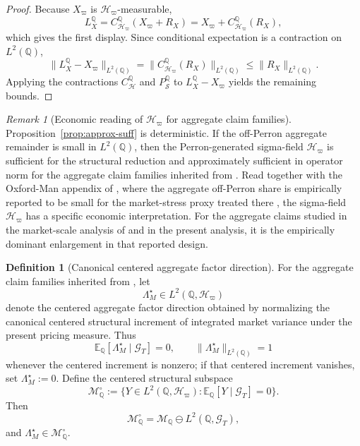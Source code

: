 \documentclass[11pt,a4paper]{amsart}
\theoremstyle{plain}
\theoremstyle{definition}
\newtheorem{definition}[theorem]{Definition}
\theoremstyle{remark}
\newtheorem{remark}[theorem]{Remark}
\newcommand{\QQ}{\mathbb{Q}}
\newcommand{\EE}{\mathbb{E}}
\newcommand{\cG}{\mathcal{G}}
\newcommand{\cH}{\mathcal{H}}
\newcommand{\cM}{\mathcal{M}}
\newcommand{\cS}{\mathcal{S}}
\begin{document}
\begin{proof}
Because \(X_\varpi\) is \(\cH_\varpi\)-measurable,
\[
        L_X^\QQ
        =
        C_{\cH_\varpi}^\QQ(X_\varpi+R_X)
        =
        X_\varpi+C_{\cH_\varpi}^\QQ(R_X),
 \]
which gives the first display.  Since conditional expectation is a contraction on \(L^2(\QQ)\),
\[
        \|L_X^\QQ-X_\varpi\|_{L^2(\QQ)}
        =
        \|C_{\cH_\varpi}^\QQ(R_X)\|_{L^2(\QQ)}
        \le
        \|R_X\|_{L^2(\QQ)}.
\]
Applying the contractions \(C_{\cH}^\QQ\) and \(P_\cS^\QQ\) to \(L_X^\QQ-X_\varpi\) yields the
remaining bounds.
\end{proof}

\begin{remark}[Economic reading of \(\cH_\varpi\) for aggregate claim families]\label{rem:approx-suff}
Proposition~\ref{prop:approx-suff} is deterministic.  If the off-Perron aggregate remainder is
small in \(L^2(\QQ)\), then the Perron-generated sigma-field \(\cH_\varpi\) is sufficient for the
structural reduction and approximately sufficient in operator norm for the aggregate claim families
inherited from \cite{vidal2026market}.  Read together with the Oxford-Man appendix of
\cite{vidal2026market}, where the aggregate off-Perron share is empirically reported to be small for
the market-stress proxy treated there
\cite{heber2009realized,barndorffNielsen2008realized,shephardSheppard2010heavy}, the sigma-field
\(\cH_\varpi\) has a specific economic interpretation.  For the aggregate claims studied in the
market-scale analysis of \cite{vidal2026market} and in the present analysis, it is the empirically
dominant enlargement in that reported design.
\end{remark}

\begin{definition}[Canonical centered aggregate factor direction]\label{def:agg-factor}
For the aggregate claim families inherited from \cite{vidal2026market}, let
\[
        \Lambda_M^\star\in L^2(\QQ,\cH_\varpi)
\]
denote the centered aggregate factor direction obtained by normalizing the canonical centered
structural increment of integrated market variance under the present pricing measure.  Thus
\[
        \EE_\QQ[\Lambda_M^\star\mid \cG_T]=0,
        \qquad
        \|\Lambda_M^\star\|_{L^2(\QQ)}=1
\]
whenever the centered increment is nonzero; if that centered increment vanishes, set
\(\Lambda_M^\star:=0\).  Define the centered structural subspace
\[
        \cM_\QQ^\circ
        :=
        \{Y\in L^2(\QQ,\cH_\varpi):\EE_\QQ[Y\mid \cG_T]=0\}.
\]
Then
\[
        \cM_\QQ^\circ
        =
        \cM_\QQ\ominus L^2(\QQ,\cG_T),
\]
and \(\Lambda_M^\star\in \cM_\QQ^\circ\).
\end{definition}
\end{document}
